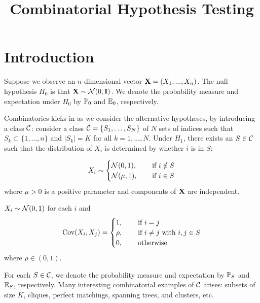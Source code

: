 \documentclass[10pt, oneside]{article}
\begin{document}
\thispagestyle{empty}
\title{Combinatorial Hypothesis Testing}



\maketitle
\addtocounter{footnote}{-1}\let\thefootnote\svthefootnote

\section{Introduction}

Suppose we observe an $n$-dimensional vector $\mathbf{X} = (X_1,...,X_n)$. The null hypothesis $H_0$ is that $\mathbf{X} \sim {\mathcal N}(0, \mathbf{I})$. We denote the probability measure and expectation under $H_0$ by $\mathbb{P}_0$ and $\mathbb{E}_0$, respectively.

Combinatorics kicks in as we consider the alternative hypotheses, by introducing a class ${\mathcal C}$: consider a class ${\mathcal C}=\{S_1,\ldots,S_N\}$ of $N$ sets of indices such that $S_k \subset\{1,\ldots,n\}$ and $|S_k| = K$ for all $k=1,\ldots,N$. Under $H_1$, there
exists an $S \in {\mathcal C}$ such that the distribution of $X_i$ is determined by whether $i$ is in $S$:
\begin{alt}
  \label{alt:mean}
$$
X_i \sim
\begin{cases}
  {\mathcal N}(0,1), \quad & \mbox{ if }i \notin S\\
  {\mathcal N}(\mu,1), & \mbox{ if }i \in S
\end{cases}
$$
where $\mu>0$ is a positive parameter and components of $\mathbf{X}$ are independent. 
\end{alt}
\begin{alt}
  \label{alt:correlation}
  $X_i \sim {\mathcal N}(0,1)$ for each $i$ and 
  $$
  \operatorname{Cov}(X_i, X_j) =
  \begin{cases}
    1, \quad & \mbox{ if }i = j\\
    \rho, & \mbox{ if }i \neq j\mbox{ with }i, j \in S\\
    0, & \mbox{ otherwise}\\
  \end{cases}
  $$
  where $\rho \in (0,1).$
\end{alt}

For each $S \in {\mathcal C}$, we denote the probability measure and expectation by $\mathbb{P}_S$ and $\mathbb{E}_S$, respectively. Many interesting combinatorial examples of ${\mathcal C}$ arises: subsets of size $K$, cliques, perfect matchings, spanning trees, and clusters, etc.
\end{document}
